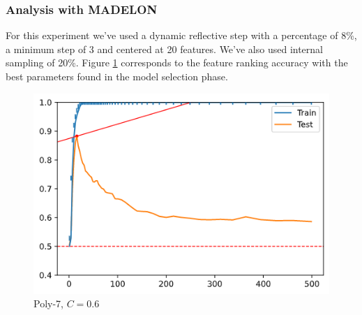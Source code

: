 \begin{table}[H]
    \centering
    \caption{Grid search of SVM-RFE with RBF kernel.}
    \label{fig:ch5.combo.art.tablerbf}
\end{table}

\subsubsection*{Analysis with MADELON}

For this experiment we've used a dynamic reflective step with a percentage of 8\%, a minimum step of 3 and centered at 20 features. We've also used internal sampling of 20\%. Figure \ref{fig:ch5.combo.madelon.one} corresponds to the feature ranking accuracy with the best pa\-ram\-e\-ters found in the model selection phase.  

\begin{figure}[H]
    \centering
    \includegraphics[width=0.4\linewidth]{img/ch5/combo/once.png}
    \caption[Combo: Result for the best found parameter configuration]{Poly-7, $C=0.6$}
    \label{fig:ch5.combo.madelon.one}
\end{figure}

